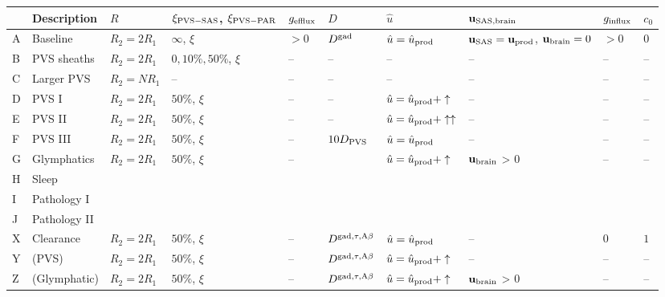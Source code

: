 \documentclass[fleqn,10pt]{wlscirep}
\begin{document}
\begin{table}
\begin{center}
  \begin{tabular}{ll|llllll|ll}
    \toprule
    & Description & $R$ & $\xi_{\rm PVS-SAS}$, $\xi_{\rm PVS-PAR}$ & $g_{\rm efflux}$ & $D$ & $\hat{u}$ & $\mathbf{u}_{\rm SAS, brain}$ & $g_{\rm influx}$ & $c_0$ \\
    \midrule
    A & Baseline  & $R_2 = 2 R_1$ & $\infty$, $\xi$\cite{koch2023estimates} &  $> 0$ & $D^{\rm gad}$\cite{sykova2008diffusion, valnes2020apparent}  & $\hat{u} = \hat{u}_{\rm prod}$ & $\mathbf{u}_{\rm SAS} = \mathbf{u}_{\rm prod}$, $\mathbf{u}_{\rm brain} = 0$ & $> 0$ & 0 \\
    B & PVS sheaths & $R_2 = 2 R_1$ & $0, 10\%, 50\%$, $\xi$\cite{koch2023estimates} & -- & --  &  --  & --  & -- & -- \\
    C & Larger PVS & $R_2 = N R_1$ & -- & -- & --  &  --  & -- & -- & -- \\
    D & PVS I & $R_2 = 2 R_1$ & $50\%$, $\xi$ & -- & --  &  $\hat{u} = \hat{u}_{\rm prod} + \uparrow$  & -- & -- & -- \\
    E & PVS II & $R_2 = 2 R_1$ & $50\%$, $\xi$ & -- & --  &  $\hat{u} = \hat{u}_{\rm prod} + \uparrow\uparrow$  & -- & -- & -- \\
    F & PVS III & $R_2 = 2 R_1$ & $50\%$, $\xi$ & -- & $10 D_{\rm PVS}$ &  $\hat{u} = \hat{u}_{\rm prod}$  & -- & -- & -- \\
    G & Glymphatics & $R_2 = 2 R_1$ & $50\%$, $\xi$ & -- & \cite{sykova2008diffusion, valnes2020apparent} &  $\hat{u} = \hat{u}_{\rm prod} + \uparrow$  & $\mathbf{u}_{\rm brain}$ > 0 & -- & -- \\
    H & Sleep &  &  & &  &  &  & & \\
    I & Pathology I &  &  & &  &  &  & & \\
    J & Pathology II &  &  & &  &  &  & & \\
    \midrule
    X & Clearance & $R_2 = 2 R_1$ & $50\%$, $\xi$ & -- & $D^{\rm gad, \tau, A\beta}$  &  $\hat{u} = \hat{u}_{\rm prod}$  & -- & $0$ & $1$ \\
    Y & (PVS) & $R_2 = 2 R_1$ & $50\%$, $\xi$ & -- & $D^{\rm gad, \tau, A\beta}$  &  $\hat{u} = \hat{u}_{\rm prod} + \uparrow$  & -- & -- & -- \\
    Z & (Glymphatic) & $R_2 = 2 R_1$ & $50\%$, $\xi$ & -- & $D^{\rm gad, \tau, A\beta}$  &  $\hat{u} = \hat{u}_{\rm prod} + \uparrow$  & $\mathbf{u}_{\rm brain}$ > 0 & -- & -- \\
    \bottomrule

\end{tabular}
\end{center}
\end{table}
\end{document}
